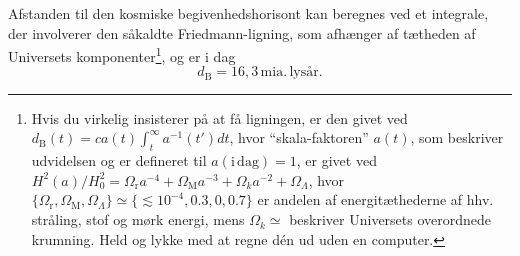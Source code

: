 \documentclass[useAMS,danish]{aa}
\begin{document}
Afstanden til den kosmiske begivenhedshorisont kan beregnes ved et integrale, der involverer den såkaldte Friedmann-ligning, som afhænger af tætheden af Universets komponenter\footnote{Hvis du virkelig insisterer på at få ligningen, er den givet ved
$d_\mathrm{B}(t) = c a(t) \int_t^\infty a^{-1}(t')dt$,
hvor ``skala-faktoren'' $a(t)$, som beskriver udvidelsen og er defineret til $a(\mathrm{i\,dag}) = 1$, er givet ved
$H^2(a)/H_0^2 = \Omega_\mathrm{r}a^{-4}
              + \Omega_\mathrm{M}a^{-3}
              + \Omega_k a^{-2}
              + \Omega_\Lambda$,
hvor $\{\Omega_\mathrm{r}, \Omega_\mathrm{M}, \Omega_\Lambda\} \simeq \{\lesssim10^{-4},0.3,0,0.7\}$ er andelen af energitæthederne af hhv. stråling, stof og mørk energi, mens $\Omega_k\simeq$ beskriver Universets overordnede krumning. Held og lykke med at regne dén ud uden en computer.}, og er i dag
\begin{equation}
    \label{eq:dB}
        d_\mathrm{B} = 16,\!3\,\mathrm{mia.\,lysår}.
\end{equation}


\end{document}
